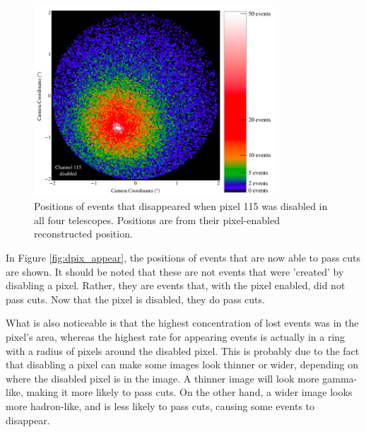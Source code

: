     \begin{figure}[ht]
      \centering
      \includegraphics[width=0.8\textwidth]{images/disabled_pixel/disappearing_events}
      \caption[Disappearing Events]{
        Positions of events that disappeared when pixel 115 was disabled in all four telescopes.
        Positions are from their pixel-enabled reconstructed position.
      }
      \label{fig:dpix_disappear}
    \end{figure}

    In Figure \ref{fig:dpix_appear}, the positions of events that are now able to pass cuts are shown.
    It should be noted that these are not events that were 'created' by disabling a pixel.
    Rather, they are events that, with the pixel enabled, did not pass cuts.
    Now that the pixel is disabled, they do pass cuts.

    What is also noticeable is that the highest concentration of lost events was in the pixel's area, whereas the highest rate for appearing events is actually in a ring with a radius of  pixels around the disabled pixel.
    This is probably due to the fact that disabling a pixel can make some images look thinner or wider, depending on where the disabled pixel is in the image.
    A thinner image will look more gamma-like, making it more likely to pass cuts.
    On the other hand, a wider image looks more hadron-like, and is less likely to pass cuts, causing some events to disappear.

